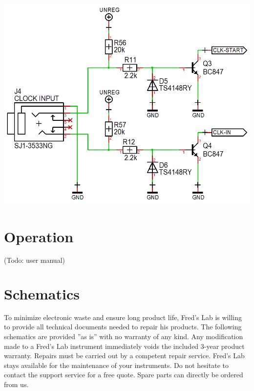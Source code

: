 \documentclass{scrartcl}
\begin{document}
\begin{center}
    \includegraphics[scale=0.40]{assets/schema-clocks.png}
\end{center}

\pagebreak


\section{Operation}

 (Todo: user manual)


\section{Schematics}

To minimize electronic waste and ensure long product life, Fred’s Lab is willing to provide all technical documents needed to repair his products. The following schematics are provided ”as is” with no warranty of any kind. Any modification made to a Fred’s Lab instrument immediately voids the included 3-year product warranty. Repairs must be carried out by a competent repair service. Fred’s Lab stays available for the maintenance of your instruments. Do not hesitate to contact the support service for a free quote. Spare parts can directly be ordered from us.
\end{document}
